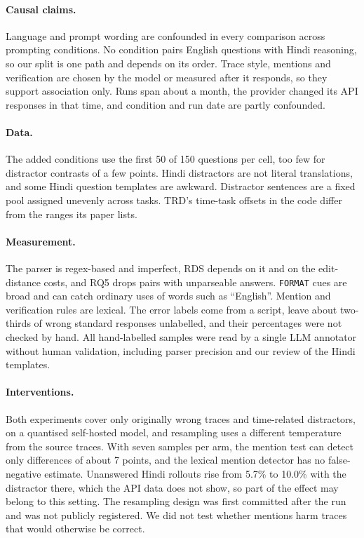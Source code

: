 \documentclass[11pt]{article}
\begin{document}
\paragraph{Causal claims.} Language and prompt wording are confounded in every comparison across prompting conditions. No condition pairs English questions with Hindi reasoning, so our split is one path and depends on its order. Trace style, mentions and verification are chosen by the model or measured after it responds, so they support association only. Runs span about a month, the provider changed its API responses in that time, and condition and run date are partly confounded.

\paragraph{Data.} The added conditions use the first 50 of 150 questions per cell, too few for distractor contrasts of a few points. Hindi distractors are not literal translations, and some Hindi question templates are awkward. Distractor sentences are a fixed pool assigned unevenly across tasks. TRD's time-task offsets in the code differ from the ranges its paper lists.

\paragraph{Measurement.} The parser is regex-based and imperfect, RDS depends on it and on the edit-distance costs, and RQ5 drops pairs with unparseable answers. \texttt{FORMAT} cues are broad and can catch ordinary uses of words such as ``English''. Mention and verification rules are lexical. The error labels come from a script, leave about two-thirds of wrong standard responses unlabelled, and their percentages were not checked by hand. All hand-labelled samples were read by a single LLM annotator without human validation, including parser precision and our review of the Hindi templates.

\paragraph{Interventions.} Both experiments cover only originally wrong traces and time-related distractors, on a quantised self-hosted model, and resampling uses a different temperature from the source traces. With seven samples per arm, the mention test can detect only differences of about 7 points, and the lexical mention detector has no false-negative estimate. Unanswered Hindi rollouts rise from 5.7\% to 10.0\% with the distractor there, which the API data does not show, so part of the effect may belong to this setting. The resampling design was first committed after the run and was not publicly registered. We did not test whether mentions harm traces that would otherwise be correct.
\end{document}
